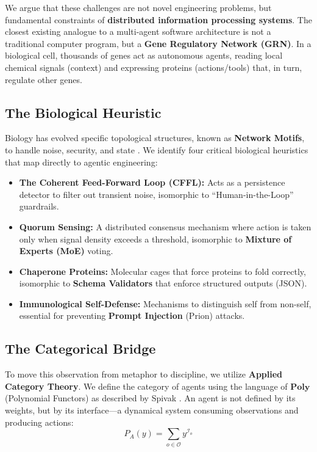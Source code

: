 \documentclass[11pt, a4paper]{article}
\newcommand{\Poly}{\mathbf{Poly}}
\begin{document}
We argue that these challenges are not novel engineering problems, but fundamental constraints of \textbf{distributed information processing systems}. The closest existing analogue to a multi-agent software architecture is not a traditional computer program, but a \textbf{Gene Regulatory Network (GRN)}. In a biological cell, thousands of genes act as autonomous agents, reading local chemical signals (context) and expressing proteins (actions/tools) that, in turn, regulate other genes.

\subsection{The Biological Heuristic}
Biology has evolved specific topological structures, known as \textbf{Network Motifs}, to handle noise, security, and state \cite{milo2002network}. We identify four critical biological heuristics that map directly to agentic engineering:
\begin{itemize}
    \item \textbf{The Coherent Feed-Forward Loop (CFFL):} Acts as a persistence detector to filter out transient noise, isomorphic to ``Human-in-the-Loop'' guardrails.
    \item \textbf{Quorum Sensing:} A distributed consensus mechanism where action is taken only when signal density exceeds a threshold, isomorphic to \textbf{Mixture of Experts (MoE)} voting.
    \item \textbf{Chaperone Proteins:} Molecular cages that force proteins to fold correctly, isomorphic to \textbf{Schema Validators} that enforce structured outputs (JSON).
    \item \textbf{Immunological Self-Defense:} Mechanisms to distinguish self from non-self, essential for preventing \textbf{Prompt Injection} (Prion) attacks.
\end{itemize}

\subsection{The Categorical Bridge}
To move this observation from metaphor to discipline, we utilize \textbf{Applied Category Theory}. We define the category of agents using the language of $\Poly$ (Polynomial Functors) as described by Spivak \cite{spivak2021learners}. An agent is not defined by its weights, but by its interface---a dynamical system consuming observations and producing actions:
\begin{equation}
    P_A(y) = \sum_{o \in \mathcal{O}} y^{\mathcal{I}_o}
\end{equation}
\end{document}
